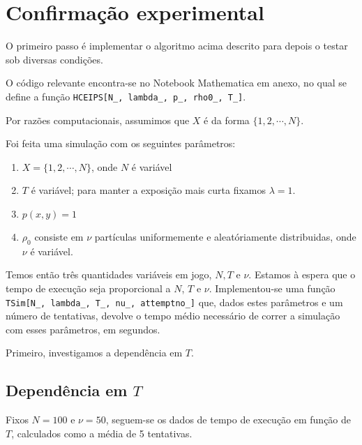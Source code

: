 \documentclass{article}
\begin{document}
	\section{Confirmação experimental}
	
	O primeiro passo é implementar o algoritmo acima descrito para depois o testar sob diversas condições.
	
	O código relevante encontra-se no Notebook Mathematica em anexo, no qual se define a função \texttt{HCEIPS[N\_, lambda\_, p\_, rho0\_, T\_]}.
	
	Por razões computacionais, assumimos que $X$ é da forma $\{1, 2, \cdots, N\}$.
	
	Foi feita uma simulação com os seguintes parâmetros:
	
	\begin{enumerate}
	\item $X = \{1, 2, \cdots, N\}$, onde $N$ é variável
	
	\item $T$ é variável; para manter a exposição mais curta fixamos $\lambda = 1$.
	
	\item $p(x,y) = 1$
	
	\item $\rho_0$ consiste em $\nu$ partículas uniformemente e aleatóriamente distribuidas, onde $\nu$ é variável.
	\end{enumerate}
	
	Temos então três quantidades variáveis em jogo, $N, T$ e $\nu$. Estamos à espera que o tempo de execução seja proporcional a $N$, $T$ e $\nu$. Implementou-se uma função \texttt{TSim[N\_, lambda\_, T\_, nu\_, attemptno\_]} que, dados estes parâmetros e um número de tentativas, devolve o tempo médio necessário de correr a simulação com esses parâmetros, em segundos.
	
	Primeiro, investigamos a dependência em $T$.
	
	\subsection{Dependência em $T$}
	
	Fixos $N = 100$ e $\nu = 50$, seguem-se os dados de tempo de execução em função de $T$, calculados como a média de 5 tentativas.
	
\end{document}
